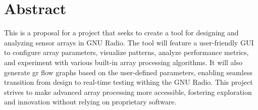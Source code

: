 \chapter*{Abstract}

This is a proposal for a project that seeks to create a tool for designing and analyzing sensor arrays in GNU Radio. The tool will feature a user-friendly GUI to configure array parameters, visualize patterns, analyze performance metrics, and experiment with various built-in array processing algorithms. It will also generate \acf{gr} flow graphs based on the user-defined parameters, enabling seamless transition from design to real-time testing withing the GNU Radio. This project strives to make advanced array processing more accessible, fostering exploration and innovation without relying on proprietary software.
